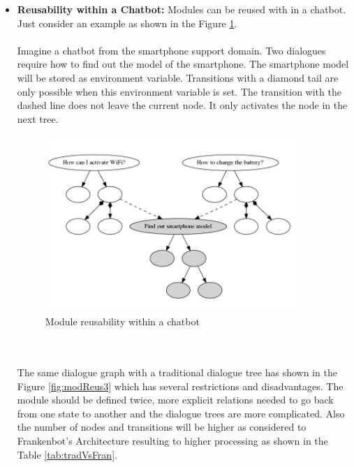 \begin{itemize}
\item \textbf{Reusability within a Chatbot:} Modules can be reused with in a chatbot. Just consider an example as shown in the Figure \ref{fig:modReus2}. 
\\~\\
Imagine a chatbot from the smartphone support domain. Two dialogues require how to find out the model of the smartphone. The smartphone model will be stored as environment variable. Transitions with a diamond tail are only possible when this environment variable is set. The transition with the dashed line does not leave the current node. It only activates the node in the next tree.
\begin{figure}[!h]
    \centering
    \includegraphics[width=0.9\textwidth]{img/Module_Reusability_2.PNG}
    \caption{Module reusability within a chatbot}
    \label{fig:modReus2}
\end{figure} 
\\~\\
The same dialogue graph with a traditional dialogue tree has shown in the Figure \ref{fig:modReus3} which has several restrictions and disadvantages. The module should be defined twice, more explicit relations needed to go back from one state to another and the dialogue trees are more complicated. Also the number of nodes and transitions will be higher as considered to Frankenbot's Architecture resulting to higher processing as shown in the Table \ref{tab:tradVsFran}.
\begin{figure}[!h]
    \centering

\end{figure}
\end{itemize}
